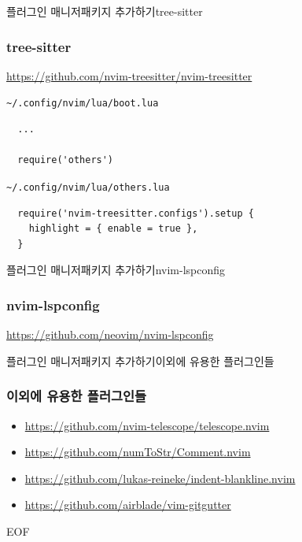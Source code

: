 \documentclass[aspectratio=169]{beamer}
\newcommand{\ssssframe}[3]{\begin{frame}[containsverbatim]{#1}{#2}{#3}\subsubsection{#3}}
\begin{document}
\ssssframe{플러그인 매니저}{패키지 추가하기}{tree-sitter}
  \url{https://github.com/nvim-treesitter/nvim-treesitter}

  \verb|~/.config/nvim/lua/boot.lua|

  \begin{verbatim}
  ...

  require('others')
  \end{verbatim}

  \verb|~/.config/nvim/lua/others.lua|

  \begin{verbatim}
  require('nvim-treesitter.configs').setup {
    highlight = { enable = true },
  }
  \end{verbatim}
\end{frame}

\ssssframe{플러그인 매니저}{패키지 추가하기}{nvim-lspconfig}
  \url{https://github.com/neovim/nvim-lspconfig}
\end{frame}

\ssssframe{플러그인 매니저}{패키지 추가하기}{이외에 유용한 플러그인들}
  \begin{itemize}
    \item \url{https://github.com/nvim-telescope/telescope.nvim}
    \item \url{https://github.com/numToStr/Comment.nvim}
    \item \url{https://github.com/lukas-reineke/indent-blankline.nvim}
    \item \url{https://github.com/airblade/vim-gitgutter}
  \end{itemize}
\end{frame}

\begin{frame}
  EOF
\end{frame}
\end{document}
